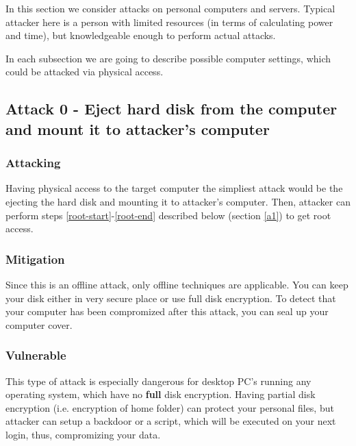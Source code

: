 In this section we consider attacks on personal computers and servers. Typical attacker here is a person with limited resources (in terms of calculating power and time), but knowledgeable enough to perform actual attacks. 

In each subsection we are going to describe possible computer settings, which could be attacked via physical access.

\subsection{Attack 0 - Eject hard disk from the computer and mount it to attacker's computer} \label{a0}

\subsubsection*{Attacking}
Having physical access to the target computer the simpliest attack would be the ejecting the hard disk and mounting it to attacker's computer. Then, attacker can perform steps \ref{root-start}-\ref{root-end} described below (section \ref{a1}) to get root access.

\subsubsection*{Mitigation}
Since this is an offline attack, only offline techniques are applicable. You can keep your disk either in very secure place or use full disk encryption. To detect that your computer has been compromized after this attack, you can seal up your computer cover.

\subsubsection*{Vulnerable}
This type of attack is especially dangerous for desktop PC's running any operating system, which have no \textbf{full} disk encryption. Having partial disk encryption (i.e. encryption of home folder) can protect your personal files, but attacker can setup a backdoor or a script, which will be executed on your next login, thus, compromizing your data.

